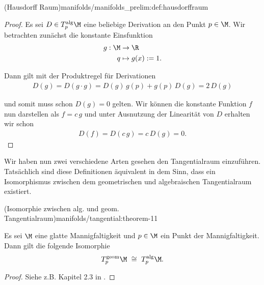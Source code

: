 \documentclass[letterpaper,10pt,english]{jupyterBook}
\begin{document}
\begin{definition}{(Hausdorff Raum)}{manifolds/manifolds_prelim:def:hausdorffraum}
\begin{proof}
 Es sei \(D\in T^{\text{alg}}_p\M\) eine beliebige Derivation an den Punkt \(p \in \M\).
Wir betrachten zunächst die konstante Einsfunktion
\begin{align*}
g:\M &\to \R\\
q &\mapsto g(x) := 1.
\end{align*}
\par
Dann gilt mit der Produktregel für Derivationen
\begin{align*}
D(g) = D(g\cdot g) = D(g)\,g(p) + g(p)\, D(g) = 2\,D(g)
\end{align*}
\par
und somit muss schon \(D(g) = 0\) gelten.
Wir können die konstante Funktion \(f\) nun darstellen als \(f= c\,g\) und unter Ausnutzung der Linearität von \(D\) erhalten wir schon
\begin{align*}
D(f) = D(c\,g) = c\,D(g) = 0.
\end{align*}\end{proof}

\par
Wir haben nun zwei verschiedene Arten gesehen den Tangentialraum einzuführen.
Tatsächlich sind diese Definitionen äquivalent in dem Sinn, dass ein Isomorphismus zwischen dem geometrischen und algebraischen Tangentialraum existiert.
\begin{theorem}{(Isomorphie zwischen alg. und geom. Tangentialraum)}{manifolds/tangential:theorem-11}



\par
Es sei \(\M\) eine glatte Mannigfaltigkeit und \(p\in\M\) ein Punkt der Mannigfaltigkeit.
Dann gilt die folgende Isomorphie
\begin{align*}
T^{\text{geom}}_p\M \ \cong \ T^{\text{alg}}_p\M.
\end{align*}\end{theorem}

\begin{proof}
 Siehe z.B. Kapitel 2.3 in \cite{Janich03}.
\end{proof}



\end{definition}
\end{document}
